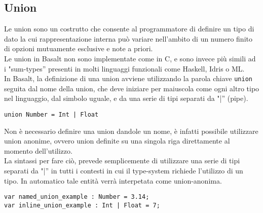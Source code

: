 \subsection{Union}
Le union sono un costrutto che consente al programmatore di definire un tipo di dato la cui rappresentazione 
interna può variare nell’ambito di un numero finito di opzioni mutuamente esclusive e note a priori. \\ 

Le union in Basalt non sono implementate come in C, e sono invece più simili ad i "sum-types” presenti in molti 
linguaggi funzionali come Haskell, Idris o ML. \\

In Basalt, la definizione di una union avviene utilizzando la parola chiave \texttt{union} seguita dal nome della union, 
che deve iniziare per maiuscola come ogni altro tipo nel linguaggio, dal simbolo uguale, 
e da una serie di tipi separati da "|” (pipe). \\

\vspace{0.5cm}
\begin{lstlisting}[frame=single]
union Number = Int | Float
\end{lstlisting}
\vspace{0.5cm}

Non è necessario definire una union dandole un nome, è infatti possibile utilizzare union anonime, 
ovvero union definite su una singola riga direttamente al momento dell’utilizzo. \\

La sintassi per fare ciò, prevede semplicemente di utilizzare  una serie di tipi separati da "|”
in tutti i contesti in cui il type-system richiede l’utilizzo di un tipo. In automatico 
tale entità verrà interpetata come union-anonima. \\

\vspace{0.5cm}
\begin{lstlisting}[frame=single]
var named_union_example : Number = 3.14;     
var inline_union_example : Int | Float = 7;
\end{lstlisting}
\vspace{0.5cm}

 
\newpage

 
\newpage


 
 
\newpage